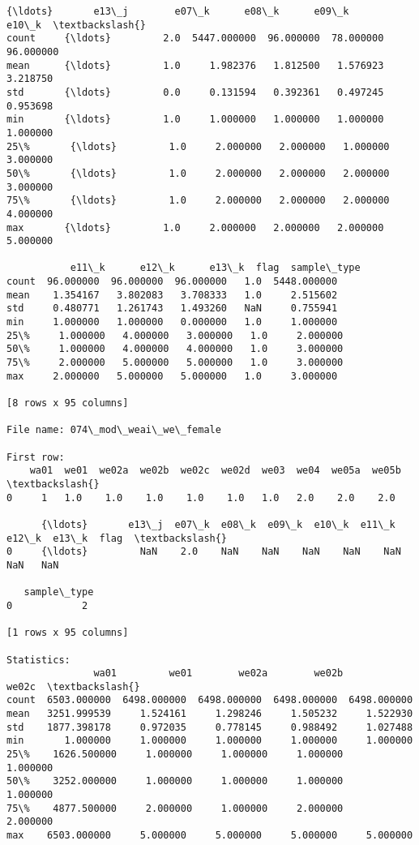 \documentclass[11pt]{article}
\begin{document}
\begin{Verbatim}[commandchars=\\\{\}]
          {\ldots}       e13\_j        e07\_k      e08\_k      e09\_k      e10\_k  \textbackslash{}
count     {\ldots}         2.0  5447.000000  96.000000  78.000000  96.000000   
mean      {\ldots}         1.0     1.982376   1.812500   1.576923   3.218750   
std       {\ldots}         0.0     0.131594   0.392361   0.497245   0.953698   
min       {\ldots}         1.0     1.000000   1.000000   1.000000   1.000000   
25\%       {\ldots}         1.0     2.000000   2.000000   1.000000   3.000000   
50\%       {\ldots}         1.0     2.000000   2.000000   2.000000   3.000000   
75\%       {\ldots}         1.0     2.000000   2.000000   2.000000   4.000000   
max       {\ldots}         1.0     2.000000   2.000000   2.000000   5.000000   

           e11\_k      e12\_k      e13\_k  flag  sample\_type  
count  96.000000  96.000000  96.000000   1.0  5448.000000  
mean    1.354167   3.802083   3.708333   1.0     2.515602  
std     0.480771   1.261743   1.493260   NaN     0.755941  
min     1.000000   1.000000   0.000000   1.0     1.000000  
25\%     1.000000   4.000000   3.000000   1.0     2.000000  
50\%     1.000000   4.000000   4.000000   1.0     3.000000  
75\%     2.000000   5.000000   5.000000   1.0     3.000000  
max     2.000000   5.000000   5.000000   1.0     3.000000  

[8 rows x 95 columns]

File name: 074\_mod\_weai\_we\_female

First row: 
    wa01  we01  we02a  we02b  we02c  we02d  we03  we04  we05a  we05b  \textbackslash{}
0     1   1.0    1.0    1.0    1.0    1.0   1.0   2.0    2.0    2.0   

      {\ldots}       e13\_j  e07\_k  e08\_k  e09\_k  e10\_k  e11\_k  e12\_k  e13\_k  flag  \textbackslash{}
0     {\ldots}         NaN    2.0    NaN    NaN    NaN    NaN    NaN    NaN   NaN   

   sample\_type  
0            2  

[1 rows x 95 columns]

Statistics: 
               wa01         we01        we02a        we02b        we02c  \textbackslash{}
count  6503.000000  6498.000000  6498.000000  6498.000000  6498.000000   
mean   3251.999539     1.524161     1.298246     1.505232     1.522930   
std    1877.398178     0.972035     0.778145     0.988492     1.027488   
min       1.000000     1.000000     1.000000     1.000000     1.000000   
25\%    1626.500000     1.000000     1.000000     1.000000     1.000000   
50\%    3252.000000     1.000000     1.000000     1.000000     1.000000   
75\%    4877.500000     2.000000     1.000000     2.000000     2.000000   
max    6503.000000     5.000000     5.000000     5.000000     5.000000   


\end{Verbatim}
\end{document}
